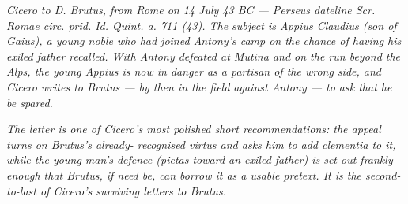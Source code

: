 
\textit{Cicero to D. Brutus, from Rome on 14 July 43 BC ---
Perseus dateline \textit{Scr. Romae circ. prid. Id. Quint.
a. 711 (43)}. The subject is Appius Claudius (son of Gaius),
a young noble who had joined Antony's camp on the chance of
having his exiled father recalled. With Antony defeated at
Mutina and on the run beyond the Alps, the young Appius is
now in danger as a partisan of the wrong side, and Cicero
writes to Brutus --- by then in the field against Antony ---
to ask that he be spared.}

\textit{The letter is one of Cicero's most polished short
recommendations: the appeal turns on Brutus's already-
recognised \textit{virtus} and asks him to add \textit{clementia}
to it, while the young man's defence (pietas toward an
exiled father) is set out frankly enough that Brutus, if
need be, can borrow it as a usable pretext. It is the
second-to-last of Cicero's surviving letters to Brutus.}
